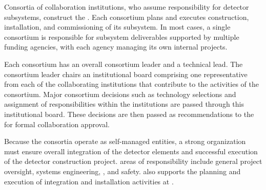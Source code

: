 Consortia of collaboration institutions, who assume responsibility 
for detector subsystems, construct the  . Each consortium plans and executes 
construction, installation, and commissioning of its subsystem.  In most cases, a single consortium is responsible for subsystem deliverables supported by 
multiple funding agencies, with each agency managing its own internal projects. 

Each consortium has an overall consortium leader 
and a technical lead.  The consortium leader chairs an institutional 
board comprising one representative from each of the collaborating 
institutions that contribute to the activities of the consortium.  Major 
consortium decisions such as technology selections and assignment of 
responsibilities within the institutions are passed through this institutional 
board.  These decisions are then passed as recommendations to 
the   for formal collaboration approval.

Because the consortia operate as self-managed entities, a strong
 organization must ensure overall integration 
of the detector elements and successful execution of the detector
construction project.   areas of responsibility include 
general project oversight, systems engineering, , and 
safety.   also supports the planning and execution 
of integration and installation activities at .  

